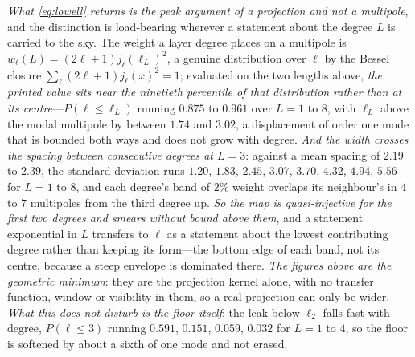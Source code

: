 \documentclass[11pt,a4paper]{article}
\theoremstyle{plain}
\theoremstyle{definition}
\theoremstyle{remark}
\begin{document}
\emph{What \eqref{eq:lowell} returns is the peak argument of a projection and not a multipole}, and the distinction is load-bearing wherever a statement about the degree $L$ is carried to the sky. The weight a layer degree places on a multipole is $w_\ell(L)=(2\ell+1)j_\ell(\ell_L)^2$, a genuine distribution over $\ell$ by the Bessel closure $\sum_\ell(2\ell+1)j_\ell(x)^2=1$; evaluated on the two lengths above, \emph{the printed value sits near the ninetieth percentile of that distribution rather than at its centre}---$P(\ell\le\ell_L)$ running $0.875$ to $0.961$ over $L=1$ to $8$, with $\ell_L$ above the modal multipole by between $1.74$ and $3.02$, a displacement of order one mode that is bounded both ways and does not grow with degree. \emph{And the width crosses the spacing between consecutive degrees at $L=3$}: against a mean spacing of $2.19$ to $2.39$, the standard deviation runs $1.20$, $1.83$, $2.45$, $3.07$, $3.70$, $4.32$, $4.94$, $5.56$ for $L=1$ to $8$, and each degree's band of $2\%$ weight overlaps its neighbour's in $4$ to $7$ multipoles from the third degree up. \emph{So the map is quasi-injective for the first two degrees and smears without bound above them}, and a statement exponential in $L$ transfers to $\ell$ as a statement about the lowest contributing degree rather than keeping its form---the bottom edge of each band, not its centre, because a steep envelope is dominated there. \emph{The figures above are the geometric minimum}: they are the projection kernel alone, with no transfer function, window or visibility in them, so a real projection can only be wider. \emph{What this does not disturb is the floor itself}: the leak below $\ell_2$ falls fast with degree, $P(\ell\le3)$ running $0.591$, $0.151$, $0.059$, $0.032$ for $L=1$ to $4$, so the floor is softened by about a sixth of one mode and not erased.
\end{document}
